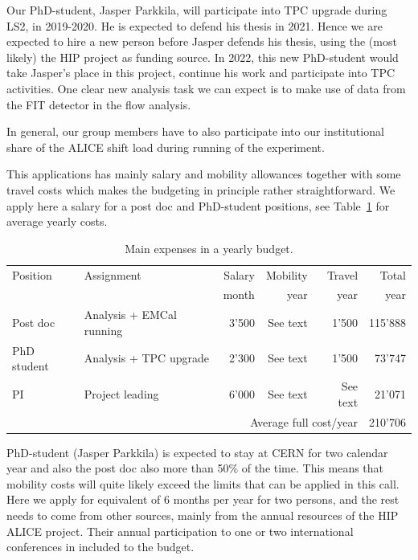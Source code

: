 Our PhD-student, Jasper Parkkila, will participate into TPC upgrade during LS2, in 2019-2020. He is expected to defend his thesis in 2021. Hence we are expected to hire a new person before Jasper defends his thesis, using the (most likely) the HIP project as funding source. In 2022, this new PhD-student would take Jasper's place in this project, continue his work and participate into TPC activities. One clear new analysis task we can expect is to make use of data from the FIT detector in the flow analysis.

In general, our group members have to also participate into our institutional share of the ALICE shift load during running of the experiment.

This applications has mainly salary and mobility allowances together with some travel costs which makes the budgeting in principle rather straightforward. We apply here a salary for a post doc and PhD-student positions, see Table~\ref{tab:money} for average yearly costs.
\begin{table}[htp]
\caption{Main expenses in a yearly budget.}
\begin{center}
\begin{tabular}{l|l|r|r|r|r}
Position & Assignment & Salary & Mobility & Travel & Total\\
& & month & year & year & year \\\hline
Post doc & Analysis + EMCal running    & 3'500 & See text & 1'500 & 115'888 \\
PhD student & Analysis + TPC upgrade & 2'300 &  See text   & 1'500 & 73'747 \\
PI & Project leading & 6'000 &  See text   & See text  & 21'071 \\
\multicolumn{5}{r}{Average full cost/year} & 210'706  \\
\end{tabular}
\end{center}
\label{tab:money}
\end{table}
PhD-student (Jasper Parkkila) is expected to stay at CERN for two calendar year and also the post doc also more than 50\% of the time. This means that mobility costs will quite likely exceed the limits that can be applied in this call. Here we apply for equivalent of 6 months per year for two persons, and the rest needs to come from other sources, mainly from the annual resources of the HIP ALICE project. Their annual participation to one or two international conferences in included to the budget.

